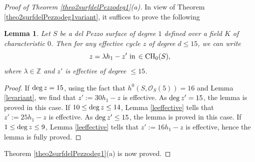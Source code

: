 \documentclass[10pt]{article}
\newtheorem{lemm}[theo]{Lemma}
\begin{document}
\begin{proof}[Proof of Theorem \ref{theo2surfdelPezzodeg1}(a)] In view of Theorem \ref{theo2surfdelPezzodeg1variant}, it suffices to prove the following
\begin{lemm}\label{lefindefin} Let $S$ be a del Pezzo surface of degree $1$ defined over a field $K$ of characteristic $0$. Then for any effective cycle $z$ of degree $d\leq 15$, we can write
$$z=\lambda h_1-z'\,\,{\rm in}\,\in{\rm CH}_0(S),$$
where $\lambda\in\mathbb{Z}$ and $z'$ is effective of degree $\leq 15$.
\end{lemm}
\begin{proof} If ${\rm deg}\,z=15$, using the fact that $h^0(S,\mathcal{O}_S(5))=16$ and Lemma \ref{levariant}, we find that $z':=30 h_1-z$ is effective. As ${\rm deg}\,z'=15$, the lemma is proved in this case. If $10\leq {\rm deg}\,z\leq 14$, Lemma \ref{leeffective} tells that $z':=25 h_1-z$ is effective. As ${\rm deg}\,z'\leq 15$, the lemma is proved in this case. If $1\leq {\rm deg}\,z\leq 9$, Lemma \ref{leeffective} tells that $z':=16 h_1-z$ is effective, hence the lemma is fully proved.
\end{proof}
Theorem \ref{theo2surfdelPezzodeg1}(a) is now proved.
\end{proof}
\end{document}

